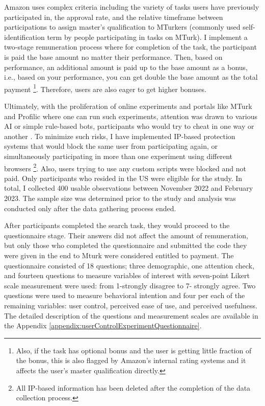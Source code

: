 \documentclass[a4paper,12pt]{article}
\begin{document}
Amazon uses complex criteria including the variety of tasks users have previously participated in, the approval rate, and the relative timeframe between participations to assign master's qualification to MTurkers (commonly used self-identification term by people participating in tasks on MTurk). I implement a two-stage remuneration process where for completion of the task, the participant is paid the base amount no matter their performance. Then, based on performance, an additional amount is paid up to the base amount as a bonus, i.e., based on your performance, you can get double the base amount as the total payment \footnote{Also, if the task has optional bonus and the user is getting little fraction of the bonus, this is also flagged by Amazon's internal rating systems and it affects the user's master qualification directly.}. Therefore, users are also eager to get higher bonuses.

Ultimately, with the proliferation of online experiments and portals like MTurk and Profilic where one can run such experiments, attention was drawn to various AI or simple rule-based bots, participants who would try to cheat in one way or another \citep{aguinis2020mturk}. To minimize such risks, I have implemented IP-based protection systems that would block the same user from participating again, or simultaneously participating in more than one experiment using different browsers \footnote{All IP-based information has been deleted after the completion of the data collection process.}. Also, users trying to use any custom scripts were blocked and not paid. Only participants who resided in the US were eligible for the study. In total, I collected 400 usable observations between November 2022 and February 2023. The sample size was determined prior to the study and analysis was conducted only after the data gathering process ended.

After participants completed the search task, they would proceed to the questionnaire stage. Their answers did not affect the amount of remuneration, but only those who completed the questionnaire and submitted the code they were given in the end to Mturk were considered entitled to payment.  The questionnaire consisted of 18 questions; three demographic, one attention check, and fourteen questions to measure variables of interest with seven-point Likert scale measurement were used: from 1-strongly disagree to 7- strongly agree. Two questions were used to measure behavioral intention and four per each of the remaining variables: user control, perceived ease of use, and perceived usefulness. The detailed description of the questions and measurement scales are available in the Appendix \ref{appendix:userControlExperimentQuestionnaire}. %
\end{document}
